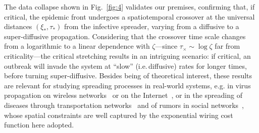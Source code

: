 \documentclass[aps, groupedaddress, superscriptaddress, prl, reprint]{revtex4-1}
\begin{document}
The data collapse shown in Fig.~\ref{fig:4} validates our premises, confirming that, if critical, the epidemic front undergoes a spatiotemporal crossover at the universal distances $(\xi_*,\tau_*)$ from the infective spreader, varying from a diffusive to a super-diffusive propagation.
Considering that the crossover time scale changes from a logarithmic to a linear dependence with $\zeta$---since $\tau_\times\!\!\sim\!\log\zeta$ far from criticality---the critical stretching results in an intriguing scenario: if critical, an outbreak will invade the system at ``slow'' (i.e.\,diffusive) rates for longer times, before turning super-diffusive. 
Besides being of theoretical interest, these results are relevant for studying spreading processes in real-world systems, e.g. in virus propagation on wireless networks~\cite{Wire009} or on the Internet~\cite{Zeg996,Watts2002}, or in the spreading of diseases through transportation networks~\cite{Hal014,Dan016} and of rumors in social networks~\cite{Watts2002}, whose spatial constraints are well captured by the exponential wiring cost function here adopted. 
\end{document}
